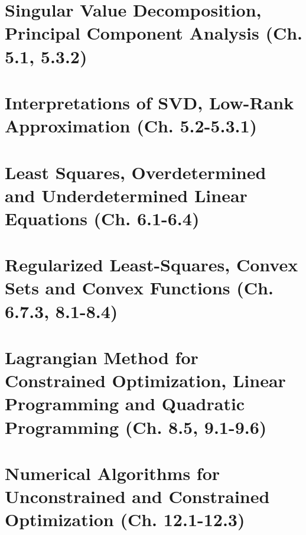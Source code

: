 \documentclass{article}
\begin{document}
\section{Singular Value Decomposition, Principal Component Analysis (Ch. 5.1, 5.3.2)}

\newpage

\section{Interpretations of SVD, Low-Rank Approximation (Ch. 5.2-5.3.1)}

\newpage

\section{Least Squares, Overdetermined and Underdetermined Linear Equations (Ch. 6.1-6.4)}

\newpage

\section{Regularized Least-Squares, Convex Sets and Convex Functions (Ch. 6.7.3, 8.1-8.4)}

\newpage

\section{Lagrangian Method for Constrained Optimization, Linear Programming and Quadratic Programming (Ch. 8.5, 9.1-9.6)}

\newpage

\section{Numerical Algorithms for Unconstrained and Constrained Optimization (Ch. 12.1-12.3)}

\end{document}
